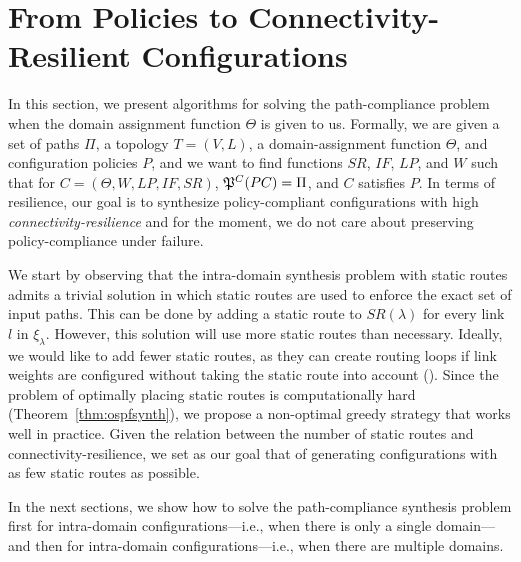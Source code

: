 \section{From Policies to Connectivity-Resilient  Configurations}
\label{sec:config-synthesis}

In this section, we present algorithms for 
solving the path-compliance problem when the domain
assignment function $\Theta$ is given to us.
Formally, we are given a set of paths $\Pi$,
a topology $T=(V,L)$,
a domain-assignment function $\Theta$, 
and configuration policies $P$,
and we want to find functions $SR$,
$IF$, $LP$, and $W$ such that for 
$C=(\Theta,W,LP,IF,SR)$,
$\mathfrak{P}^C(PC) = \Pi$, and
$C$ satisfies $P$.
In terms of resilience, our goal is to synthesize policy-compliant configurations
with high
\emph{connectivity-resilience} and for the moment, we do not care about 
preserving policy-compliance under failure.

We start by observing that 
the intra-domain synthesis problem with static routes
admits a trivial solution in which 
static routes are used to enforce the exact set of input paths. 
This can be done by adding a 
static route to $SR(\lambda)$ for every link $l$ in $\xi_\lambda$. 
However, this solution will use more static routes than necessary. 
Ideally, we would like to add fewer static routes, as they can 
create routing loops if link weights are configured without taking 
the static route into account (). 
Since the problem of optimally placing static routes is computationally hard (Theorem~\ref{thm:ospfsynth}), 
we propose a non-optimal greedy strategy that works well in practice.
Given the relation between the number of static routes and connectivity-resilience,
we set as our goal that of generating configurations with as few static routes as possible.




In the next sections, 
we  show how to solve the  path-compliance synthesis problem first for intra-domain configurations---i.e., when there
is only a single domain---and then  for intra-domain configurations---i.e., when
there are multiple domains.

